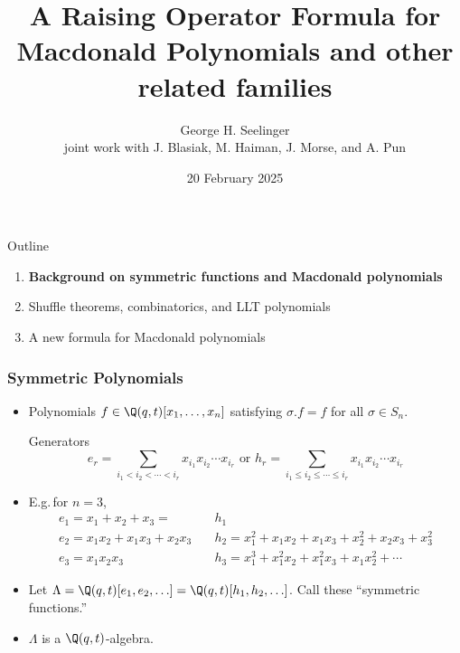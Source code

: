 \documentclass[dvipsnames]{beamer}
\title[Macdonald Catalanimals]{A Raising Operator Formula for
  Macdonald Polynomials and other related families} %
\author[George H. Seelinger]{George H. Seelinger \\ joint work with
  J. Blasiak, M. Haiman, J. Morse, and A. Pun} %
\institute[UMich] %
{
ghseeli@umich.edu\\ %
\medskip
University of Illinois Algebra-Geometry-Combinatorics Seminar\\ %
\medskip
}
\date{20 February 2025} %
\newcommand{\sym}{\Lambda}
\theoremstyle{definition}
\newcounter{c}
\begin{document}
\begin{frame}
\titlepage %
\end{frame}
\begin{frame}{Outline}
  \begin{enumerate}
  \item {\bf Background on symmetric functions and Macdonald polynomials}
  \item Shuffle theorems, combinatorics, and LLT polynomials
  \item A new formula for Macdonald polynomials
  \end{enumerate}
\end{frame}
\begin{frame}
  \frametitle{Symmetric Polynomials}
  \begin{itemize}
  \item Polynomials \(f \in \Q(q,t)[x_1,\ldots,x_n]\) satisfying \(\sigma.f
    = f\) for all \(\sigma \in S_n\).\pause
    \begin{block}{Generators}
    \[
      e_r =
      \sum_{i_1 < i_2 < \cdots < i_r} x_{i_1} x_{i_2} \cdots x_{i_r}
      \text { or }
      h_r = 
      \sum_{i_1 \leq i_2 \leq \cdots \leq i_r} x_{i_1} x_{i_2} \cdots x_{i_r}
    \]\pause 
  \end{block}
    \item E.g.\,for \(n=3\),
    \begin{align*}
      e_1 = x_1 + x_2 + x_3 = & h_1  \\
      e_2 = x_1 x_2 + x_1 x_3 + x_2 x_3 \quad & h_2 = x_1^2 + x_1 x_2 + x_1
                                          x_3 + x_2^2 +  x_2 x_3 +x_3^2  \\
      e_3 = x_1 x_2 x_3 \quad & h_3 = x_1^3 + x_1^2 x_2 + x_1^2 x_3 + x_1
                          x_2^2 + \cdots
    \end{align*} \pause
    \item Let \(\sym =
      \Q(q,t)[e_1,e_2,\ldots] = \Q(q,t)[h_1,h_2,\ldots]\). Call these
      ``symmetric functions.''\pause
    \item \(\sym\) is a \(\Q(q,t)\)-algebra.
  \end{itemize}
\end{frame}
\end{document}
